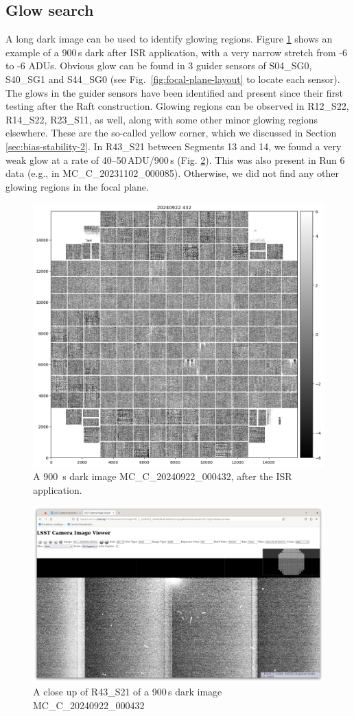 \clearpage
\subsection{Glow search}
A long dark image can be used to identify glowing regions. Figure \ref{fig:glowsearch} shows an example of a 900\,s dark after ISR application, with a very narrow stretch from -6 to -6 ADUs. 
Obvious glow can be found in 3 guider sensors of S04\_SG0, S40\_SG1 and S44\_SG0 (see Fig.~\ref{fig:focal-plane-layout} to locate each sensor). The glows in the guider sensors have been identified and present since their first testing after the Raft construction.
Glowing regions can be observed in R12\_S22, R14\_S22, R23\_S11, as well, along with some other minor glowing regions elsewhere. These are the so-called yellow corner, which we discussed in Section \ref{sec:bias-stability-2}.
In R43\_S21 between Segments 13 and 14, we found a very weak glow at a rate of 40--50\,ADU/900\,s (Fig. \ref{fig:glowsearch:closeup}). This was also present in Run 6 data (e.g., in MC\_C\_20231102\_000085).
Otherwise, we did not find any other glowing regions in the focal plane.

\begin{figure}
    \centering
    \includegraphics[width=0.5\linewidth]{figures/glowsearch/900sdark.png}
    \caption{A 900\, s dark image MC\_C\_20240922\_000432, after the ISR application.}
    \label{fig:glowsearch}
\end{figure}
\begin{figure}
    \centering
    \includegraphics[width=1.0\linewidth]{figures/glowsearch/R43S21.png}
    \caption{A close up of R43\_S21 of a 900\,s dark image MC\_C\_20240922\_000432}
    \label{fig:glowsearch:closeup}
\end{figure}


